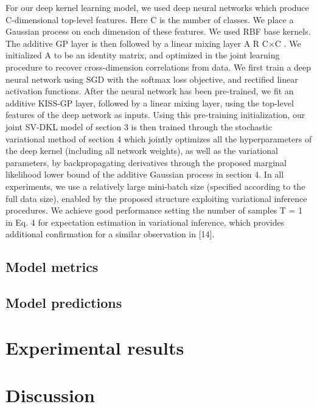 \documentclass[a4paper, nobind]{templates/cdethesis}
\begin{document}
For our deep kernel learning model, we used deep neural networks which produce
C-dimensional top-level features. Here C is the number of classes. We place a Gaussian process on each dimension of these features. We used RBF base kernels. The additive GP layer is then followed by a linear mixing layer A R C×C . We initialized A to be an identity matrix, and optimized in the joint learning procedure to recover cross-dimension correlations from data.
We first train a deep neural network using SGD with the softmax loss objective, and rectified linear activation functions. After the neural network has been pre-trained, we fit an additive KISS-GP layer, followed by a linear mixing layer, using the top-level features of the deep network as inputs. Using this pre-training initialization, our joint SV-DKL model of section 3 is then trained through the stochastic variational method of section 4 which jointly optimizes all the hyperparameters of the deep kernel (including all network weights), as well as the variational parameters, by backpropagating derivatives through the proposed marginal likelihood lower bound of the additive Gaussian process in section 4. In all experiments, we use a relatively large mini-batch size (specified according to the full data size), enabled by the proposed structure exploiting variational inference procedures. We achieve good performance setting the number of samples T = 1 in Eq. 4 for expectation estimation in variational inference, which provides additional confirmation for a similar observation in {[}14{]}.

\hypertarget{model-metrics}{%
\subsection{Model metrics}\label{model-metrics}}

\label{section:metrics}

\hypertarget{model-predictions}{%
\subsection{Model predictions}\label{model-predictions}}

\hypertarget{experimental-results}{%
\section{Experimental results}\label{experimental-results}}

\hypertarget{discussion}{%
\section{Discussion}\label{discussion}}
\end{document}
